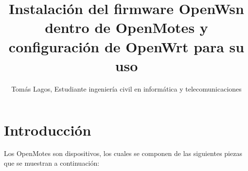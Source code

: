 \documentclass[journal]{IEEEtran}
\begin{document}
%
\title{Instalación del firmware OpenWsn dentro de OpenMotes y configuración de OpenWrt para su uso}
\author{Tomás Lagos, Estudiante ingeniería civil en informática y telecomunicaciones}
        
\maketitle
\IEEEpeerreviewmaketitle
\section{Introducción}
Los OpenMotes son dispositivos, los cuales se componen de las siguientes piezas que se muestran a continuación:
\end{document}
